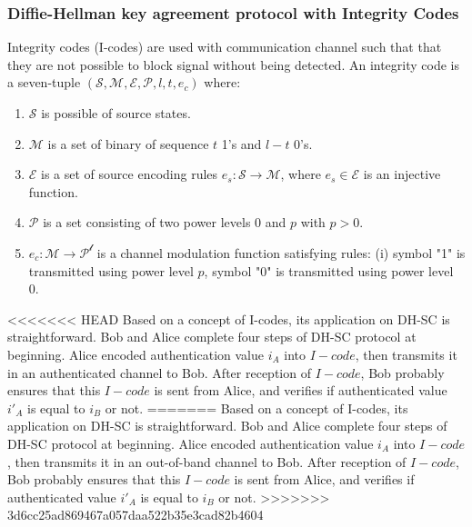 \subsubsection*{Diffie-Hellman key agreement protocol with Integrity Codes}

Integrity codes (I-codes) are used with communication channel such that that they are not possible to block signal without being detected. An integrity code is a seven-tuple $(\mathcal{S},\mathcal{M},\mathcal{E},\mathcal{P},l,t,e_c)$ where:
\begin{enumerate}
\item $\mathcal{S}$ is possible of source states. 
\item $\mathcal{M}$ is a set of binary of sequence $t$ 1's and $l-t$ 0's. 
\item $\mathcal{E}$ is a set of source encoding rules $e_s: \mathcal{S} \rightarrow \mathcal{M}$, where $e_s \in \mathcal{E}$ is an injective function. 
\item $\mathcal{P}$ is a set consisting of two power levels 0 and $p$ with $p > 0$.
\item $e_c:\mathcal{M} \rightarrow \mathcal{P^l}$ is a channel modulation function satisfying rules: (i) symbol "1" is transmitted using power level $p$, symbol "0" is transmitted using power level 0. 
\end{enumerate} 

<<<<<<< HEAD
Based on a concept of I-codes, its application on DH-SC is straightforward. Bob and Alice complete four steps of DH-SC protocol at beginning. Alice encoded authentication value $i_A$ into $I-code$, then transmits it in an authenticated channel to Bob. After reception of $I-code$, Bob probably ensures that this $I-code$ is sent from Alice, and verifies if authenticated value $i'_A$ is equal to $i_B$ or not. 
=======
Based on a concept of I-codes, its application on DH-SC is straightforward. Bob and Alice complete four steps of DH-SC protocol at beginning. Alice encoded authentication value $i_A$ into $I-code$, then transmits it in an out-of-band channel to Bob. After reception of $I-code$, Bob probably ensures that this $I-code$ is sent from Alice, and verifies if authenticated value $i'_A$ is equal to $i_B$ or not. 
>>>>>>> 3d6cc25ad869467a057daa522b35e3cad82b4604
 
